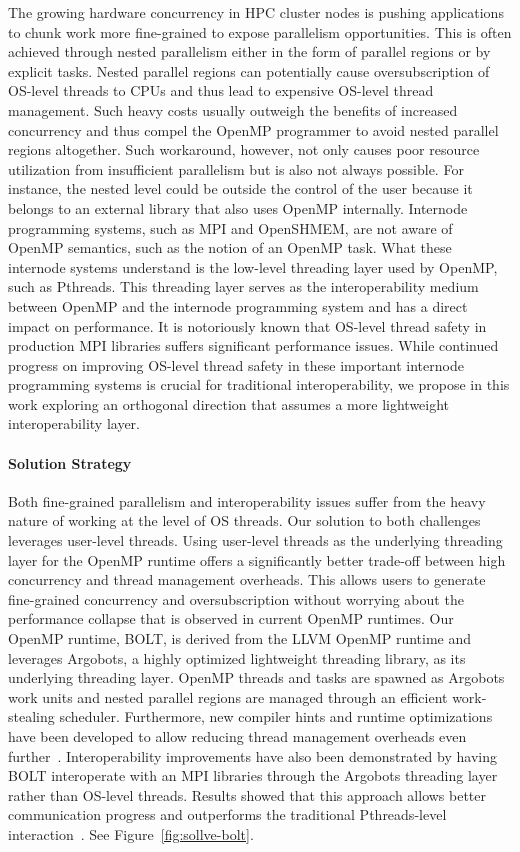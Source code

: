 The growing hardware concurrency in HPC
cluster nodes is pushing applications to chunk work more fine-grained
to expose parallelism opportunities.  This is often achieved through
nested parallelism either in the form of parallel regions or by
explicit tasks.  Nested parallel regions can potentially cause
oversubscription of OS-level threads to CPUs and thus lead to
expensive OS-level thread management.  Such heavy costs usually
outweigh the benefits of increased concurrency and thus compel the
OpenMP programmer to avoid nested parallel regions altogether.  Such
workaround, however, not only causes poor resource utilization from
insufficient parallelism but is also not always possible.  For
instance, the nested level could be outside the control of the user
because it belongs to an external library that also uses OpenMP
internally.  Internode programming systems, such as MPI and OpenSHMEM,
are not aware of OpenMP semantics, such as the notion of an OpenMP
task.  What these internode systems understand is the low-level
threading layer used by OpenMP, such as Pthreads.  This threading
layer serves as the interoperability medium between OpenMP and the
internode programming system and has a direct impact on performance.
It is notoriously known that OS-level thread safety in production MPI
libraries suffers significant performance issues. While continued
progress on improving OS-level thread safety in these important
internode programming systems is crucial for traditional
interoperability, we propose in this work exploring an orthogonal
direction that assumes a more lightweight interoperability layer.

\paragraph{Solution Strategy}

Both fine-grained parallelism and interoperability issues suffer from
the heavy nature of working at the level of OS threads.  Our solution
to both challenges leverages user-level threads.  Using user-level
threads as the underlying threading layer for the OpenMP runtime
offers a significantly better trade-off between high concurrency and
thread management overheads.  This allows users to generate
fine-grained concurrency and oversubscription without worrying about
the performance collapse that is observed in current OpenMP runtimes.
Our OpenMP runtime, BOLT, is derived from the LLVM OpenMP runtime and
leverages Argobots, a highly optimized lightweight threading library,
as its underlying threading layer.  OpenMP threads and tasks are
spawned as Argobots work units and nested parallel regions are managed
through an efficient work-stealing scheduler.  Furthermore, new
compiler hints and runtime optimizations have been developed to allow
reducing thread management overheads even further~\cite{iwasaki2018,
iwasaki2020}. Interoperability improvements have also been
demonstrated by having BOLT interoperate with an MPI libraries through
the Argobots threading layer rather than OS-level threads.  Results
showed that this approach allows better communication progress and
outperforms the traditional Pthreads-level interaction~\cite{seo2018}. See Figure~\ref{fig:sollve-bolt}.

